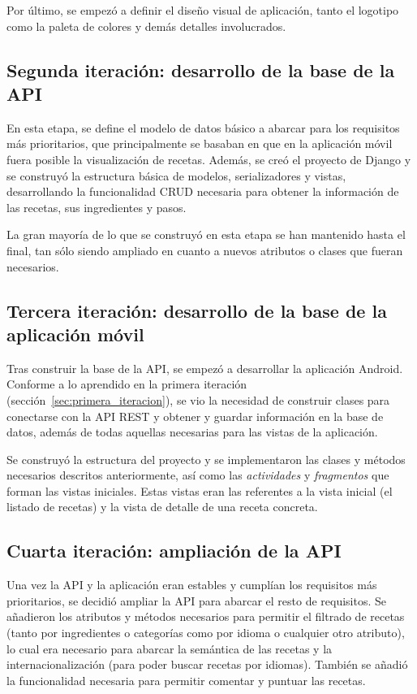 Por último, se empezó a definir el diseño visual de aplicación, tanto el
logotipo como la paleta de colores y demás detalles involucrados.


\subsection{Segunda iteración: desarrollo de la base de la API}
\label{sec:segunda_iteracion}

En esta etapa, se define el modelo de datos básico a abarcar para los requisitos
más prioritarios, que principalmente se basaban en que en la aplicación móvil
fuera posible la visualización de recetas. Además, se creó el proyecto de Django
y se construyó la estructura básica de modelos, serializadores y vistas,
desarrollando la funcionalidad CRUD necesaria para obtener la información de las
recetas, sus ingredientes y pasos.

La gran mayoría de lo que se construyó en esta etapa se han mantenido hasta el
final, tan sólo siendo ampliado en cuanto a nuevos atributos o clases que fueran
necesarios.


\subsection{Tercera iteración: desarrollo de la base de la aplicación móvil}
\label{sec:tercera_iteracion}

Tras construir la base de la API, se empezó a desarrollar la aplicación Android.
Conforme a lo aprendido en la primera iteración
(sección~\ref{sec:primera_iteracion}), se vio la necesidad de construir clases
para conectarse con la API \ac{REST} y obtener y guardar información
en la base de datos, además de todas aquellas necesarias para las vistas de la
aplicación.

Se construyó la estructura del proyecto y se implementaron las clases y métodos
necesarios descritos anteriormente, así como las \textit{actividades} y
\textit{fragmentos} que forman las vistas iniciales. Estas vistas eran las
referentes a la vista inicial (el listado de recetas) y la vista de detalle de
una receta concreta.


\subsection{Cuarta iteración: ampliación de la API}
\label{sec:cuarta_iteracion}

Una vez la API y la aplicación eran estables y cumplían los requisitos más
prioritarios, se decidió ampliar la API para abarcar el resto de requisitos. Se
añadieron los atributos y métodos necesarios para permitir el filtrado de recetas
(tanto por ingredientes o categorías como por idioma o cualquier otro atributo),
lo cual era necesario para abarcar la semántica de las recetas y la
internacionalización (para poder buscar recetas por idiomas). También se añadió
la funcionalidad necesaria para permitir comentar y puntuar las recetas.


